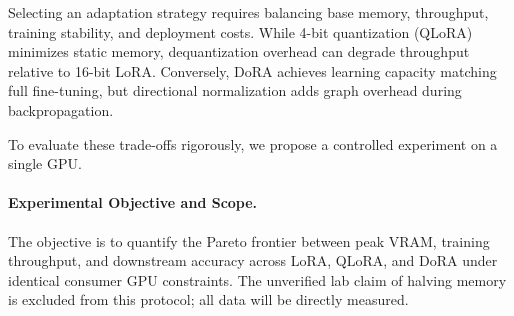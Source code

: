 \documentclass[11pt,a4paper]{article}
\begin{document}
Selecting an adaptation strategy requires balancing base memory, throughput, training stability, and deployment costs. While 4-bit quantization (QLoRA) minimizes static memory, dequantization overhead can degrade throughput relative to 16-bit LoRA. Conversely, DoRA achieves learning capacity matching full fine-tuning, but directional normalization adds graph overhead during backpropagation.

To evaluate these trade-offs rigorously, we propose a controlled experiment on a single GPU.

\paragraph{Experimental Objective and Scope.}
The objective is to quantify the Pareto frontier between peak VRAM, training throughput, and downstream accuracy across LoRA, QLoRA, and DoRA under identical consumer GPU constraints. The unverified lab claim of halving memory is excluded from this protocol; all data will be directly measured.
\end{document}
